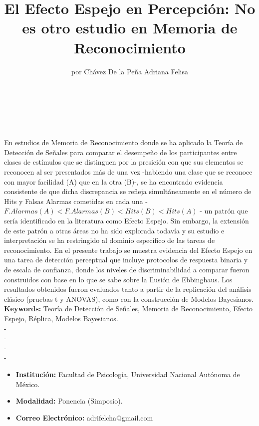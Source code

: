 \documentclass[letterpaper]{article}
\begin{document}
\title{El Efecto Espejo en Percepción: No es otro estudio en Memoria de Reconocimiento}\\
\author{por Chávez De la Peña Adriana Felisa}\\
\maketitle

En estudios de Memoria de Reconocimiento donde se ha aplicado la Teoría de Detección de Señales para comparar el desempeño de los participantes entre clases de estímulos que se distinguen por la presición con que sus elementos se reconocen al ser presentados más de una vez -habiendo una clase que se reconoce con mayor facilidad (A) que en la otra (B)-, se ha encontrado evidencia consistente de que dicha discrepancia se refleja simultáneamente en el número de Hits y Falsas Alarmas cometidas en cada una -$F.Alarmas(A) < F.Alarmas (B) < Hits(B) < Hits(A)$ - un patrón que sería identificado en la literatura como Efecto Espejo. Sin embargo, la extensión de este patrón a otras áreas no ha sido explorada todavía y su estudio e interpretación se ha restringido al dominio específico de las tareas de reconocimiento. En el presente trabajo se muestra evidencia del Efecto Espejo en una tarea de detección perceptual que incluye protocolos de respuesta binaria y de escala de confianza, donde los niveles de discriminabilidad a comparar fueron construidos con base en lo que se sabe sobre la Ilusión de Ebbinghaus. Los resultados obtenidos fueron evaluados tanto a partir de la replicación del análisis clásico (pruebas t y ANOVAS), como con la construcción de Modelos Bayesianos.\\

\textbf{Keywords:} Teoría de Detección de Señales, Memoria de Reconocimiento, Efecto Espejo, Réplica, Modelos Bayesianos.\\
-\\
-\\
-\\
-\\

\begin{itemize}
\item \textbf{Institución:} Facultad de Psicología, Universidad Nacional Autónoma de México.
\item \textbf{Modalidad:} Ponencia (Simposio).
\item \textbf{Correo Electrónico:} adrifelcha@gmail.com
\end{itemize}
\end{document}
